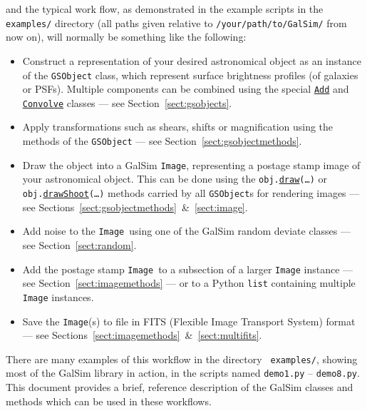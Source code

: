 \documentclass[preprint,11pt]{../../devel/modules/aastex}
\begin{document}
and the typical work flow, as demonstrated in the example scripts in the {\tt
examples/} directory (all paths given relative to
\texttt{/your/path/to/GalSim/} from now on), will normally
be something like the following:
\begin{itemize}

\item Construct a representation of your desired astronomical object
  as an instance of the {\tt GSObject} class, which represent surface brightness profiles (of galaxies or PSFs).  Multiple components can be
  combined using the special
  \href{http://galsim-developers.github.com/GalSim/classgalsim_1_1base_1_1_add.html}{\texttt{Add}}
  and 
  \href{http://galsim-developers.github.com/GalSim/classgalsim_1_1base_1_1_convolve.html}{\texttt{Convolve}}
  classes --- see Section~\ref{sect:gsobjects}.
\item Apply transformations such as shears, shifts or magnification
  using the methods of the \texttt{GSObject} --- see Section~\ref{sect:gsobjectmethods}.
\item Draw the object into a GalSim \texttt{Image}, representing a postage
  stamp image of your astronomical object.  This can be done using the
  \texttt{obj.}\href{http://galsim-developers.github.com/GalSim/classgalsim_1_1base_1_1_g_s_object.html#ae0b346a8b438dedbc7f60a52220869d8}{\texttt{draw}}\texttt{(\dots)}
  or
  \texttt{obj.}\href{http://galsim-developers.github.com/GalSim/classgalsim_1_1base_1_1_g_s_object.html#a42ac334d2840ba3fa832988e998beca0}{\texttt{drawShoot}}\texttt{(\dots)}
  methods carried by all \texttt{GSObject}s for rendering images --- see
  Sections~\ref{sect:gsobjectmethods}~\&~\ref{sect:image}.
\item Add noise to the \texttt{Image}~using one of the GalSim
  random deviate classes --- see Section~\ref{sect:random}.
\item Add the postage stamp \texttt{Image}~to a subsection of a larger
  \texttt{Image} 
  instance --- see
  Section~\ref{sect:imagemethods} --- or to a Python
  \texttt{list} containing multiple \texttt{Image} instances.
\item Save the \texttt{Image}(s) to file in FITS (Flexible Image Transport
  System) format --- see Sections~\ref{sect:imagemethods}~\&~\ref{sect:multifits}.
\end{itemize}

There are many examples of this workflow in the directory {\tt
 examples/}, showing most of the GalSim library in action, in
the scripts named \texttt{demo1.py} -- \texttt{demo8.py}.  This
document provides a brief, reference description of the GalSim classes
and methods which can be used in these workflows.
\end{document}
